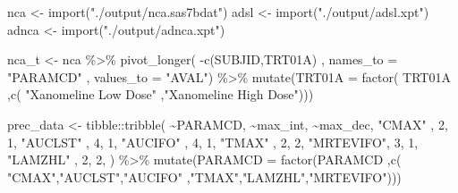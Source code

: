 \documentclass[
  letterpaper,
  DIV=11,
  numbers=noendperiod]{scrreprt}
\newenvironment{Shaded}{\begin{snugshade}}{\end{snugshade}}
\newcommand{\AttributeTok}[1]{\textcolor[rgb]{0.40,0.45,0.13}{#1}}
\newcommand{\DecValTok}[1]{\textcolor[rgb]{0.68,0.00,0.00}{#1}}
\newcommand{\FunctionTok}[1]{\textcolor[rgb]{0.28,0.35,0.67}{#1}}
\newcommand{\NormalTok}[1]{\textcolor[rgb]{0.00,0.23,0.31}{#1}}
\newcommand{\OtherTok}[1]{\textcolor[rgb]{0.00,0.23,0.31}{#1}}
\newcommand{\SpecialCharTok}[1]{\textcolor[rgb]{0.37,0.37,0.37}{#1}}
\newcommand{\StringTok}[1]{\textcolor[rgb]{0.13,0.47,0.30}{#1}}
\begin{document}
\begin{Shaded}
\begin{Highlighting}[]
\NormalTok{nca  }\OtherTok{\textless{}{-}} \FunctionTok{import}\NormalTok{(}\StringTok{"./output/nca.sas7bdat"}\NormalTok{)}
\NormalTok{adsl }\OtherTok{\textless{}{-}} \FunctionTok{import}\NormalTok{(}\StringTok{"./output/adsl.xpt"}\NormalTok{)}
\NormalTok{adnca }\OtherTok{\textless{}{-}} \FunctionTok{import}\NormalTok{(}\StringTok{"./output/adnca.xpt"}\NormalTok{)}

\NormalTok{nca\_t  }\OtherTok{\textless{}{-}}\NormalTok{ nca }\SpecialCharTok{\%\textgreater{}\%} 
  \FunctionTok{pivot\_longer}\NormalTok{(  }\SpecialCharTok{{-}}\FunctionTok{c}\NormalTok{(SUBJID,TRT01A)}
\NormalTok{               , }\AttributeTok{names\_to =} \StringTok{"PARAMCD"}
\NormalTok{               , }\AttributeTok{values\_to =} \StringTok{"AVAL"}\NormalTok{) }\SpecialCharTok{\%\textgreater{}\%}
  \FunctionTok{mutate}\NormalTok{(}\AttributeTok{TRT01A =} \FunctionTok{factor}\NormalTok{( TRT01A}
\NormalTok{                         ,}\FunctionTok{c}\NormalTok{( }\StringTok{"Xanomeline Low Dose"}
\NormalTok{                            ,}\StringTok{"Xanomeline High Dose"}\NormalTok{)))}

\NormalTok{prec\_data }\OtherTok{\textless{}{-}}\NormalTok{ tibble}\SpecialCharTok{::}\FunctionTok{tribble}\NormalTok{(}
  \SpecialCharTok{\textasciitilde{}}\NormalTok{PARAMCD, }\SpecialCharTok{\textasciitilde{}}\NormalTok{max\_int, }\SpecialCharTok{\textasciitilde{}}\NormalTok{max\_dec,}
  \StringTok{"CMAX"}\NormalTok{    ,   }\DecValTok{2}\NormalTok{, }\DecValTok{1}\NormalTok{,}
  \StringTok{"AUCLST"}\NormalTok{  ,   }\DecValTok{4}\NormalTok{, }\DecValTok{1}\NormalTok{,}
  \StringTok{"AUCIFO"}\NormalTok{  ,   }\DecValTok{4}\NormalTok{, }\DecValTok{1}\NormalTok{,}
  \StringTok{"TMAX"}\NormalTok{    ,   }\DecValTok{2}\NormalTok{, }\DecValTok{2}\NormalTok{,}
  \StringTok{"MRTEVIFO"}\NormalTok{,   }\DecValTok{3}\NormalTok{, }\DecValTok{1}\NormalTok{,}
  \StringTok{"LAMZHL"}\NormalTok{  ,   }\DecValTok{2}\NormalTok{, }\DecValTok{2}\NormalTok{,}
\NormalTok{  ) }\SpecialCharTok{\%\textgreater{}\%}
  \FunctionTok{mutate}\NormalTok{(}\AttributeTok{PARAMCD =} \FunctionTok{factor}\NormalTok{(PARAMCD}
\NormalTok{                          ,}\FunctionTok{c}\NormalTok{( }\StringTok{"CMAX"}\NormalTok{,}\StringTok{"AUCLST"}\NormalTok{,}\StringTok{"AUCIFO"}
\NormalTok{                             ,}\StringTok{"TMAX"}\NormalTok{,}\StringTok{"LAMZHL"}\NormalTok{,}\StringTok{"MRTEVIFO"}\NormalTok{)))}


\end{Highlighting}
\end{Shaded}
\end{document}
